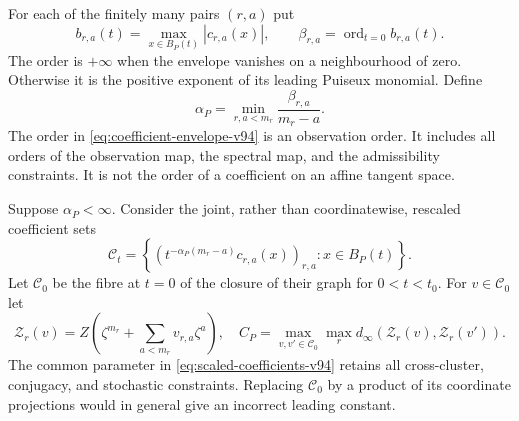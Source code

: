 For each of the finitely many pairs $(r,a)$ put
\begin{equation}\label{eq:coefficient-envelope-v94}
 b_{r,a}(t)=\max_{x\in B_P(t)}|c_{r,a}(x)|,
 \qquad \beta_{r,a}=\operatorname{ord}_{t=0}b_{r,a}(t).
\end{equation}
The order is $+\infty$ when the envelope vanishes on a neighbourhood
of zero. Otherwise it is the positive exponent of its leading
Puiseux monomial. Define
\begin{equation}\label{eq:germ-edge-v94}
 \alpha_P=\min_{r,a<m_r}\frac{\beta_{r,a}}{m_r-a}.
\end{equation}
The order in \eqref{eq:coefficient-envelope-v94} is an observation
order. It includes all orders of the observation map, the spectral
map, and the admissibility constraints. It is not the order of a
coefficient on an affine tangent space.

Suppose $\alpha_P<\infty$. Consider the joint, rather than
coordinatewise, rescaled coefficient sets
\begin{equation}\label{eq:scaled-coefficients-v94}
 \mathcal C_t=
 \left\{\left(t^{-\alpha_P(m_r-a)}c_{r,a}(x)\right)_{r,a}:
                                           x\in B_P(t)\right\}.
\end{equation}
Let $\mathcal C_0$ be the fibre at $t=0$ of the closure of their
graph for $0<t<t_0$. For $v\in\mathcal C_0$ let
\[
 \mathcal Z_r(v)=Z\left(\zeta^{m_r}
                              +\sum_{a<m_r}v_{r,a}\zeta^a\right),
 \quad
 C_P=\max_{v,v'\in\mathcal C_0}\max_r
                         d_\infty(\mathcal Z_r(v),\mathcal Z_r(v')).
\]
The common parameter in \eqref{eq:scaled-coefficients-v94} retains
all cross-cluster, conjugacy, and stochastic constraints. Replacing
$\mathcal C_0$ by a product of its coordinate projections would in
general give an incorrect leading constant.

